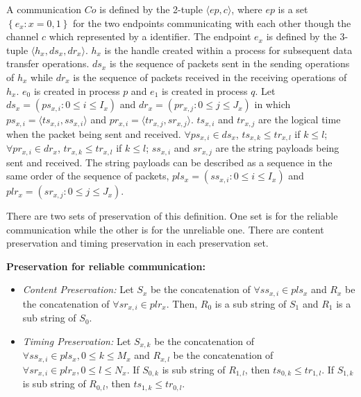 A communication $Co$ is defined by the 2-tuple $\langle ep, c \rangle$, where $ep$ is a set $\left\lbrace e_{x}: x= 0,1\right\rbrace $ for the two endpoints communicating with each other though the channel $c$ which represented by a identifier. The endpoint $e_{x}$ is defined by the 3-tuple $\langle h_{x}, ds_{x}, dr_{x}\rangle$. $h_{x}$ is the handle created within a process for subsequent data transfer operations. $ds_{x}$ is the sequence of packets sent in the sending operations of $h_{x}$ while $dr_{x}$ is the sequence of packets received in the receiving operations of $h_{x}$. $e_{0}$ is created in process $p$ and $e_{1}$ is created in process $q$. Let $ds_{x} = \left(ps_{x,i}: 0\leqslant i \leqslant I_{x} \right)$ and $dr_{x} = \left(pr_{x,j}: 0\leqslant j \leqslant J_{x} \right)$ in which $ps_{x,i} = \langle ts_{x,i}, ss_{x,i} \rangle$ and $pr_{x,i} = \langle tr_{x,j}, sr_{x,j} \rangle$. $ts_{x,i}$ and $tr_{x,j}$ are the logical time when the packet being sent and received. $\forall ps_{x,i} \in ds_{x}$, $ts_{x,k} \leqslant tr_{x,l}$ if $k \leqslant l$; $\forall pr_{x,i} \in dr_{x}$, $tr_{x,k} \leqslant tr_{x,l}$ if $k \leqslant l$; $ss_{x,i}$ and $sr_{x,j}$ are the string payloads being sent and received. The string payloads can be described as a sequence in the same order of the sequence of packets, $pls_{x} = \left(ss_{x,i}: 0\leqslant i \leqslant I_{x} \right)$ and $plr_{x} = \left(sr_{x,j}: 0\leqslant j \leqslant J_{x} \right)$. 

There are two sets of preservation of this definition. One set is for the reliable communication while the other is for the unreliable one. There are content preservation and timing preservation in each preservation set.

\textbf{Preservation for reliable communication:}
\begin{itemize}
 \item \textit{ Content Preservation:} Let $S_{x}$ be the concatenation of $\forall ss_{x,i} \in pls_{x}$ and $R_{x}$ be the concatenation of $\forall sr_{x,i} \in plr_{x}$. Then, $R_{0}$ is a sub string of $S_{1}$ and $R_{1}$ is a sub string of $S_{0}$.
 \item \textit{Timing Preservation:} Let $S_{x,k}$ be the concatenation of $\forall ss_{x,i} \in pls_{x}, 0 \leqslant k \leqslant M_{x}$ and $R_{x,l}$ be the concatenation of $\forall sr_{x,i} \in plr_{x}, 0 \leqslant l \leqslant N_{x}$. If $S_{0,k}$ is sub string of $R_{1,l}$, then $ts_{0,k} \leqslant tr_{1,l}$. If $S_{1,k}$ is sub string of $R_{0,l}$, then $ts_{1,k} \leqslant tr_{0,l}$. 
\end{itemize}

